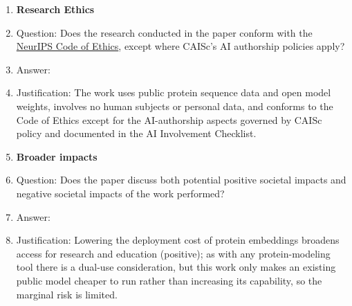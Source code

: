 \documentclass{article}
\begin{document}
\begin{enumerate}
\item {\bf Research Ethics}
    \item[] Question: Does the research conducted in the paper conform with the \href{https://neurips.cc/Conferences/2026/MainTrackHandbook}{NeurIPS Code of Ethics}, except where CAISc's AI authorship policies apply?
    \item[] Answer: \answerYes{}
    \item[] Justification: The work uses public protein sequence data and open model weights, involves no human subjects or personal data, and conforms to the Code of Ethics except for the AI-authorship aspects governed by CAISc policy and documented in the AI Involvement Checklist.

\item {\bf Broader impacts}
    \item[] Question: Does the paper discuss both potential positive societal impacts and negative societal impacts of the work performed?
    \item[] Answer: \answerYes{}
    \item[] Justification: Lowering the deployment cost of protein embeddings broadens access for research and education (positive); as with any protein-modeling tool there is a dual-use consideration, but this work only makes an existing public model cheaper to run rather than increasing its capability, so the marginal risk is limited.

\end{enumerate}
\end{document}
